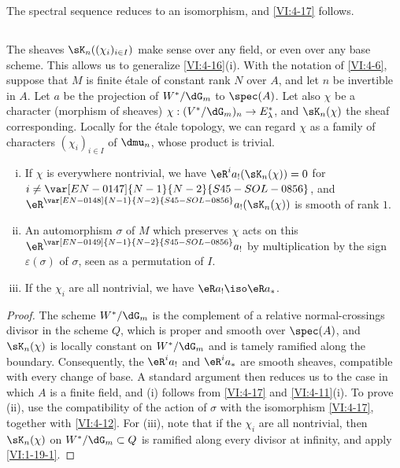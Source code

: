 The spectral sequence reduces to an isomorphism, and \ref{VI:4-17} follows. 





\subsection{}\label{VI:4-19}

The sheaves $\sK_n((\chi_i)_{i\in I})$ make sense over any field, 
or even over any base scheme. This allows us to generalize 
\ref{VI:4-16}(i). With the notation of \ref{VI:4-6}, suppose that $M$ is finite 
étale of constant rank $N$ over $A$, and let $n$ be invertible in $A$. 
Let $a$ be the projection of $W^\ast/\dG_m$ to $\spec(A)$. Let also $\chi$ be 
a character (morphism of sheaves) 
$\chi:(V^\ast/\dG_m)_n \to E_\lambda^\ast$, and $\sK_n(\chi)$ the sheaf 
corresponding. Locally for the étale topology, we can regard $\chi$ 
as a family of characters $(\chi_i)_{i\in I}$ of $\dmu_n$, whose product is 
trivial.

\begin{proposition_}\label{VI:4-20}
\begin{enumerate}[(i)]
  \item If $\chi$ is everywhere nontrivial, we have 
    $\eR^i a_! (\sK_n(\chi)) = 0$ for $i\ne \var[EN-0147]{N-1}{N-2}{S45-SOL-0856}$, and 
    $\eR^{\var[EN-0148]{N-1}{N-2}{S45-SOL-0856}} a_!(\sK_n(\chi))$ is smooth of rank $1$. 
  \item An automorphism $\sigma$ of $M$ which preserves $\chi$ acts on this 
    $\eR^{\var[EN-0149]{N-1}{N-2}{S45-SOL-0856}} a_!$ by multiplication by the sign $\varepsilon(\sigma)$ 
    of $\sigma$, seen as a permutation of $I$. 
  \item If the $\chi_i$ are all nontrivial, we have $\eR a_! \iso \eR a_\ast$. 
\end{enumerate}
\end{proposition_}
\begin{proof}[Proof]
The scheme $W^\ast/\dG_m$ is the complement of a relative normal-crossings 
divisor in the scheme $Q$, which is proper and smooth over $\spec(A)$, and 
$\sK_n(\chi)$ is 
locally constant on $W^\ast/\dG_m$ and is tamely ramified 
along the boundary. Consequently, the $\eR^i a_!$ and 
$\eR^i a_\ast$ are smooth sheaves, compatible with every change of 
base. A standard argument then reduces us to the case in which $A$ is a 
finite field, and (i) follows from \ref{VI:4-17} and \ref{VI:4-11}(i). 
To prove (ii), use the compatibility of the action of $\sigma$ with 
the isomorphism \ref{VI:4-17}, together with \ref{VI:4-12}. For (iii), note that if the 
$\chi_i$ are all nontrivial, then $\sK_n(\chi)$ on 
$W^\ast/\dG_m\subset Q$ is ramified along every divisor at infinity, 
and apply \ref{VI:1-19-1}. 
\end{proof}











